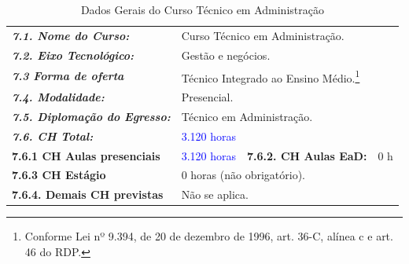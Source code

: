 \documentclass{../../modelos/latex-shared/ifsc-ppc}
\newcommand{\revisao}[1]{\textcolor{blue}{#1}}
\newcommand{\revisao}[1]{#1}
\begin{document}
\renewcommand{\tablename}{Quadro}
\begin{table}[H]
\centering
\small
\caption{Dados Gerais do Curso Técnico em Administração}
\label{qua:dados-curso}
\vspace{0.2cm}
\begin{tabularx}{\linewidth}{|p{4.4cm}|X|p{3.8cm}|X|}
\hline
\rowcolor{cinzaTabela}
\multicolumn{4}{|l|}{\textcolor{ifscgreen}{\textbf{\large 7. Dados do Curso:}}} \\ \hline
\textcolor{ifscgreen}{\textbf{\textit{7.1. Nome do Curso:}}} & \multicolumn{3}{p{\dimexpr\linewidth-4.4cm-4\tabcolsep-3\arrayrulewidth\relax}|}{Curso Técnico em Administração.} \\ \hline
\textcolor{ifscgreen}{\textbf{\textit{7.2. Eixo Tecnológico:}}} & \multicolumn{3}{p{\dimexpr\linewidth-4.4cm-4\tabcolsep-3\arrayrulewidth\relax}|}{Gestão e negócios.} \\ \hline
\textcolor{ifscgreen}{\textbf{\textit{7.3 Forma de oferta}}} & \multicolumn{3}{p{\dimexpr\linewidth-4.4cm-4\tabcolsep-3\arrayrulewidth\relax}|}{Técnico Integrado ao Ensino Médio.\footnote{Conforme Lei nº 9.394, de 20 de dezembro de 1996, art. 36-C, alínea c e art. 46 do RDP.}} \\ \hline
\textcolor{ifscgreen}{\textbf{\textit{7.4. Modalidade:}}} & \multicolumn{3}{p{\dimexpr\linewidth-4.4cm-4\tabcolsep-3\arrayrulewidth\relax}|}{Presencial.} \\ \hline
\textcolor{ifscgreen}{\textbf{\textit{7.5. Diplomação do Egresso:}}} & \multicolumn{3}{p{\dimexpr\linewidth-4.4cm-4\tabcolsep-3\arrayrulewidth\relax}|}{Técnico em Administração.} \\ \hline
\textcolor{ifscgreen}{\textbf{\textit{7.6. CH Total:}}} & \multicolumn{3}{p{\dimexpr\linewidth-4.4cm-4\tabcolsep-3\arrayrulewidth\relax}|}{\revisao{3.120 horas}} \\ \hline
\textcolor{ifscgreen}{\textbf{7.6.1 CH Aulas presenciais}} & \revisao{3.120 horas} & \textcolor{ifscgreen}{\textbf{7.6.2. CH Aulas EaD:}} & 0 h \\ \hline
\textcolor{ifscgreen}{\textbf{7.6.3 CH Estágio}} & \multicolumn{3}{p{\dimexpr\linewidth-4.4cm-4\tabcolsep-3\arrayrulewidth\relax}|}{0 horas (não obrigatório).} \\ \hline
\textcolor{ifscgreen}{\textbf{7.6.4. Demais CH previstas}} & \multicolumn{3}{p{\dimexpr\linewidth-4.4cm-4\tabcolsep-3\arrayrulewidth\relax}|}{Não se aplica.} \\ \hline
\end{tabularx}
\end{table}
\end{document}
